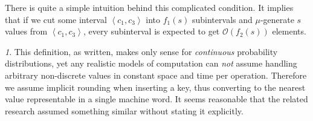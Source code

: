 \documentclass[
submission
]{dmtcs-episciences}
\theoremstyle{plain}
\theoremstyle{definition}
\theoremstyle{remark}
\newtheorem*{rem*}{\protect\remarkname}
\theoremstyle{plain}
\theoremstyle{plain}
\providecommand{\remarkname}{Remark}
\def\interval#1#2{\left\langle#1,#2\right\rangle}
\def\Prob#1{\Pr\!\left[#1\right]}
\def\OO{\mathcal O}
\begin{document}
There is quite a simple intuition behind this complicated condition. It implies that if we cut some interval $\interval{c_1}{c_3}$ into $f_1(s)$ subintervals and $\mu$-generate $s$ values from $\interval{c_1}{c_3}$, every subinterval is expected to get $\OO(f_2(s))$ elements.

\begin{rem*}
This definition, as written, makes only sense for \emph{continuous} probability
distributions, yet any realistic models of computation can
\emph{not} assume handling arbitrary non-discrete values in constant
space and time per operation. Therefore we assume implicit rounding
when inserting a key, thus converting to the nearest value representable
in a single machine word. It seems reasonable that the related research
assumed something similar without stating it explicitly.
\end{rem*}


\end{document}

